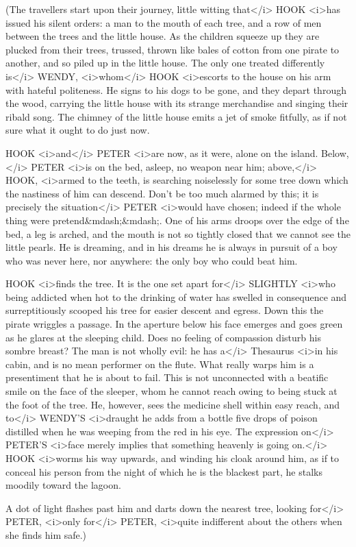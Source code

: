\begin{stagedir}
(The travellers start upon their journey, little witting that</i> HOOK <i>has issued his silent orders: a man to the mouth of each tree, and a row of men between the trees and the little house. As the children squeeze up they are plucked from their trees, trussed, thrown like bales of cotton from one pirate to another, and so piled up in the little house. The only one treated differently is</i> WENDY, <i>whom</i> HOOK <i>escorts to the house on his arm with hateful politeness. He signs to his dogs to be gone, and they depart through the wood, carrying the little house with its strange merchandise and singing their ribald song. The chimney of the little house emits a jet of smoke fitfully, as if not sure what it ought to do just now.

HOOK <i>and</i> PETER <i>are now, as it were, alone on the island. Below,</i> PETER <i>is on the bed, asleep, no weapon near him; above,</i> HOOK, <i>armed to the teeth, is searching noiselessly for some tree down which the nastiness of him can descend. Don't be too much alarmed by this; it is precisely the situation</i> PETER <i>would have chosen; indeed if the whole thing were pretend&mdash;&mdash;. One of his arms droops over the edge of the bed, a leg is arched, and the mouth is not so tightly closed that we cannot see the little pearls. He is dreaming, and in his dreams he is always in pursuit of a boy who was never here, nor anywhere: the only boy who could beat him.

HOOK <i>finds the tree. It is the one set apart for</i> SLIGHTLY <i>who being addicted when hot to the drinking of water has swelled in consequence and surreptitiously scooped his tree for easier descent and egress. Down this the pirate wriggles a passage. In the aperture below his face emerges and goes green as he glares at the sleeping child. Does no feeling of compassion disturb his sombre breast? The man is not wholly evil: he has a</i> Thesaurus <i>in his cabin, and is no mean performer on the flute. What really warps him is a presentiment that he is about to fail. This is not unconnected with a beatific smile on the face of the sleeper, whom he cannot reach owing to being stuck at the foot of the tree. He, however, sees the medicine shell within easy reach, and to</i> WENDY'S <i>draught he adds from a bottle five drops of poison distilled when he was weeping from the red in his eye. The expression on</i> PETER'S <i>face merely implies that something heavenly is going on.</i> HOOK <i>worms his way upwards, and winding his cloak around him, as if to conceal his person from the night of which he is the blackest part, he stalks moodily toward the lagoon.

A dot of light flashes past him and darts down the nearest tree, looking for</i> PETER, <i>only for</i> PETER, <i>quite indifferent about the others when she finds him safe.)
\end{stagedir}

